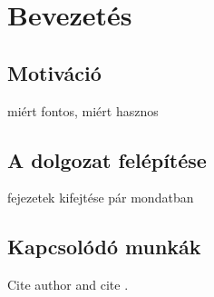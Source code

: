 \chapter{Bevezetés} %
\label{ch:intro}

\section{Motiváció}
miért fontos, miért hasznos

\section{A dolgozat felépítése}

fejezetek kifejtése pár mondatban


\section{Kapcsolódó munkák}

Cite author  \citeauthor{li2015automatic} and cite \cite{han2016deep}. 